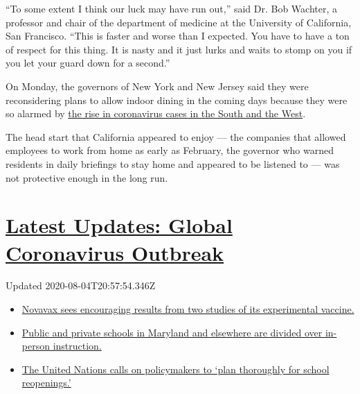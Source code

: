 ``To some extent I think our luck may have run out,'' said Dr. Bob
Wachter, a professor and chair of the department of medicine at the
University of California, San Francisco. ``This is faster and worse than
I expected. You have to have a ton of respect for this thing. It is
nasty and it just lurks and waits to stomp on you if you let your guard
down for a second.''

On Monday, the governors of New York and New Jersey said they were
reconsidering plans to allow indoor dining in the coming days because
they were so alarmed by
\href{https://www.nytimes.com/2020/06/14/us/coronavirus-united-states.html}{the
rise in coronavirus cases in the South and the West}.

The head start that California appeared to enjoy --- the companies that
allowed employees to work from home as early as February, the governor
who warned residents in daily briefings to stay home and appeared to be
listened to --- was not protective enough in the long run.

\hypertarget{latest-updates-global-coronavirus-outbreak}{%
\section{\texorpdfstring{\href{https://www.nytimes.com/2020/08/04/world/coronavirus-cases.html?action=click\&pgtype=Article\&state=default\&region=MAIN_CONTENT_1\&context=storylines_live_updates}{Latest
Updates: Global Coronavirus
Outbreak}}{Latest Updates: Global Coronavirus Outbreak}}\label{latest-updates-global-coronavirus-outbreak}}

Updated 2020-08-04T20:57:54.346Z

\begin{itemize}
\tightlist
\item
  \href{https://www.nytimes.com/2020/08/04/world/coronavirus-cases.html?action=click\&pgtype=Article\&state=default\&region=MAIN_CONTENT_1\&context=storylines_live_updates\#link-1228a480}{Novavax
  sees encouraging results from two studies of its experimental
  vaccine.}
\item
  \href{https://www.nytimes.com/2020/08/04/world/coronavirus-cases.html?action=click\&pgtype=Article\&state=default\&region=MAIN_CONTENT_1\&context=storylines_live_updates\#link-4825b93}{Public
  and private schools in Maryland and elsewhere are divided over
  in-person instruction.}
\item
  \href{https://www.nytimes.com/2020/08/04/world/coronavirus-cases.html?action=click\&pgtype=Article\&state=default\&region=MAIN_CONTENT_1\&context=storylines_live_updates\#link-50f7386d}{The
  United Nations calls on policymakers to `plan thoroughly for school
  reopenings.'}
\end{itemize}

